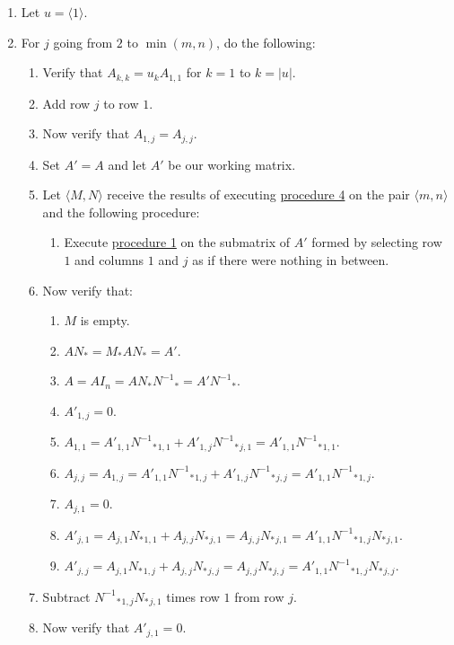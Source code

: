 \documentclass[twocolumn]{article}
\begin{document}
				\begin{enumerate}
					\item Let $u=\langle 1\rangle$.
					\item For $j$ going from $2$ to $\min(m,n)$, do the following:
					\begin{enumerate}
						\item Verify that $A_{k,k}=u_kA_{1,1}$ for $k=1$ to $k=\lvert u\rvert$.
						\item Add row $j$ to row $1$.
						\item Now verify that $A_{1,j}=A_{j,j}$.
						\item Set $A'=A$ and let $A'$ be our working matrix.
						\item Let $\langle M,N\rangle$ receive the results of executing \hyperref[sec:procedure 4]{procedure 4} on the pair $\langle m,n\rangle$ and the following procedure:
						\begin{enumerate}
							\item Execute \hyperref[sec:procedure 1]{procedure 1} on the submatrix of $A'$ formed by selecting row $1$ and columns $1$ and $j$ as if there were nothing in between.
						\end{enumerate}
						\item Now verify that:
						\begin{enumerate}
							\item $M$ is empty.
							\item $AN_*=M_*AN_*=A'$.
							\item $A=AI_n=AN_*{N^{-1}}_*=A'{N^{-1}}_*$.
							\item $A'_{1,j}=0$.
							\item $A_{1,1}=A'_{1,1}{{N^{-1}}_*}_{1,1}+A'_{1,j}{{N^{-1}}_*}_{j,1}=A'_{1,1}{{N^{-1}}_*}_{1,1}$.
							\item $A_{j,j}=A_{1,j}=A'_{1,1}{{N^{-1}}_*}_{1,j}+A'_{1,j}{{N^{-1}}_*}_{j,j}=A'_{1,1}{{N^{-1}}_*}_{1,j}$.
							\item $A_{j,1}=0$.
							\item $A'_{j,1}=A_{j,1}{N_*}_{1,1}+A_{j,j}{N_*}_{j,1}=A_{j,j}{N_*}_{j,1}=A'_{1,1}{{N^{-1}}_*}_{1,j}{N_*}_{j,1}$.
							\item $A'_{j,j}=A_{j,1}{N_*}_{1,j}+A_{j,j}{N_*}_{j,j}=A_{j,j}{N_*}_{j,j}=A'_{1,1}{{N^{-1}}_*}_{1,j}{N_*}_{j,j}$.
						\end{enumerate}
						\item Subtract ${{N^{-1}}_*}_{1,j}{N_*}_{j,1}$ times row $1$ from row $j$.
						\item Now verify that $A'_{j,1}=0$.

\end{enumerate}
\end{enumerate}
\end{document}
